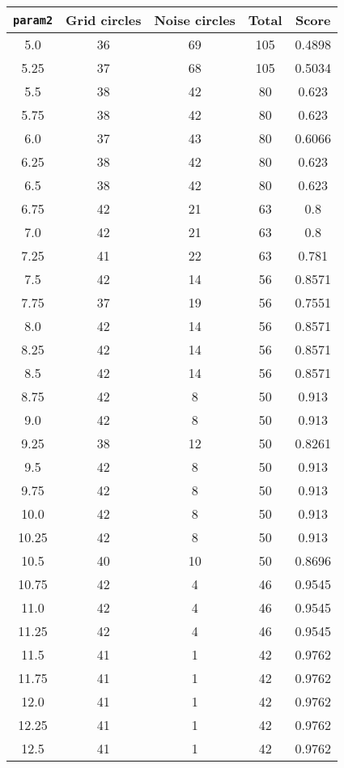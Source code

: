 \documentclass[letterpaper, 12pt]{article}
\begin{document}
\begin{longtable}{|c|c|c|c|c|}
\hline
\textbf{\texttt{param2}} & \textbf{Grid circles} & \textbf{Noise circles} & \textbf{Total} & \textbf{Score} \\
\hline
5.0 & 36 & 69 & 105 & 0.4898 \\
\hline
5.25 & 37 & 68 & 105 & 0.5034 \\
\hline
5.5 & 38 & 42 & 80 & 0.623 \\
\hline
5.75 & 38 & 42 & 80 & 0.623 \\
\hline
6.0 & 37 & 43 & 80 & 0.6066 \\
\hline
6.25 & 38 & 42 & 80 & 0.623 \\
\hline
6.5 & 38 & 42 & 80 & 0.623 \\
\hline
6.75 & 42 & 21 & 63 & 0.8 \\
\hline
7.0 & 42 & 21 & 63 & 0.8 \\
\hline
7.25 & 41 & 22 & 63 & 0.781 \\
\hline
7.5 & 42 & 14 & 56 & 0.8571 \\
\hline
7.75 & 37 & 19 & 56 & 0.7551 \\
\hline
8.0 & 42 & 14 & 56 & 0.8571 \\
\hline
8.25 & 42 & 14 & 56 & 0.8571 \\
\hline
8.5 & 42 & 14 & 56 & 0.8571 \\
\hline
8.75 & 42 & 8 & 50 & 0.913 \\
\hline
9.0 & 42 & 8 & 50 & 0.913 \\
\hline
9.25 & 38 & 12 & 50 & 0.8261 \\
\hline
9.5 & 42 & 8 & 50 & 0.913 \\
\hline
9.75 & 42 & 8 & 50 & 0.913 \\
\hline
10.0 & 42 & 8 & 50 & 0.913 \\
\hline
10.25 & 42 & 8 & 50 & 0.913 \\
\hline
10.5 & 40 & 10 & 50 & 0.8696 \\
\hline
10.75 & 42 & 4 & 46 & 0.9545 \\
\hline
11.0 & 42 & 4 & 46 & 0.9545 \\
\hline
11.25 & 42 & 4 & 46 & 0.9545 \\
\hline
11.5 & 41 & 1 & 42 & 0.9762 \\
\hline
11.75 & 41 & 1 & 42 & 0.9762 \\
\hline
12.0 & 41 & 1 & 42 & 0.9762 \\
\hline
12.25 & 41 & 1 & 42 & 0.9762 \\
\hline
12.5 & 41 & 1 & 42 & 0.9762 \\

\end{longtable}
\end{document}

